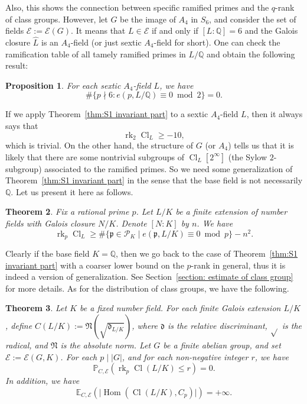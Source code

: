 \documentclass{amsart}
\numberwithin{equation}{section}
\theoremstyle{plain}
\newtheorem{theorem}{Theorem}[section]
\newtheorem{proposition}[theorem]{Proposition}
\theoremstyle{definition}
\theoremstyle{remark}
\begin{document}
Also, this shows the connection between specific ramified primes and the $q$-rank of class groups.
However, let $G$ be the image of $A_4$ in $S_6$, and consider the set of fields $\mathcal{E}:=\mathcal{E}(G)$.
It means that $L\in\mathcal{E}$ if and only if $[L:\mathbb{Q}]=6$ and the Galois closure $\hat{L}$ is an $A_4$-field (or just sextic $A_4$-field for short).
One can check the ramification table of all tamely ramified primes in $L/\mathbb{Q}$ and obtain the following result:
\begin{proposition}
	For each sextic $A_4$-field $L$, we have
	\begin{equation*}
		\#\{p\nmid 6: e(p,L/\mathbb{Q})\equiv0\bmod{2}\}=0.
	\end{equation*}
\end{proposition}
If we apply Theorem~\ref{thm:S1 invariant part} to a sextic $A_4$-field $L$, then it always says that 
\begin{equation*}
	\operatorname{rk}_2\operatorname{Cl}_L\geq-10,
\end{equation*}
which is trivial.
On the other hand, the structure of $G$ (or $A_4$) tells us that it is likely that there are some nontrivial subgroups of $\operatorname{Cl}_L[2^\infty]$ (the Sylow $2$-subgroup) associated to the ramified primes.
So we need some generalization of Theorem~\ref{thm:S1 invariant part} in the sense that the base field is not necessarily $\mathbb{Q}$.
Let us present it here as follows.
\begin{theorem}\label{thm: S1 estimate of class group}
    Fix a rational prime $p$.
    Let $L/K$ be a finite extension of number fields with Galois closure $N/K$.
    Denote $[N:K]$ by $n$.
    We have
	\[\operatorname{rk}_p\operatorname{Cl}_L\geq\#\{\mathfrak{p}\in\mathcal{P}_K\mid e(\mathfrak{p},L/K)\equiv0\bmod{p}\}-n^2.\]
\end{theorem}
Clearly if the base field $K=\mathbb{Q}$, then we go back to the case of Theorem~\ref{thm:S1 invariant part} with a coarser lower bound on the $p$-rank in general, thus it is indeed a version of generalization.
See Section~\ref{section: estimate of class group} for more details.
As for the distribution of class groups, we have the following.
\begin{theorem}\label{thm: S1 dist of rel class group abelian}
	Let $K$ be a fixed number field.
	For each finite Galois extension $L/K$, define $C(L/K):=\mathfrak{N}(\sqrt{\mathfrak{d}_{L/K}})$, 
    where $\mathfrak{d}$ is the relative discriminant, $\sqrt{}$ is the radical, and $\mathfrak{N}$ is the absolute norm.
	Let $G$ be a finite abelian group, and set $\mathcal{E}:=\mathcal{E}(G,K)$.
	For each $p\mid\lvert G\rvert$, and for each non-negative integer $r$, we have 
	\begin{equation*}
		\mathbb{P}_{C,\mathcal{E}}(\operatorname{rk}_p\operatorname{Cl}(L/K)\leq r)=0.
	\end{equation*}
	In addition, we have
	\begin{equation*}
		\mathbb{E}_{C,\mathcal{E}}(\lvert\operatorname{Hom}(\operatorname{Cl}(L/K),C_p)\rvert)=+\infty.
	\end{equation*}
\end{theorem}
\end{document}
